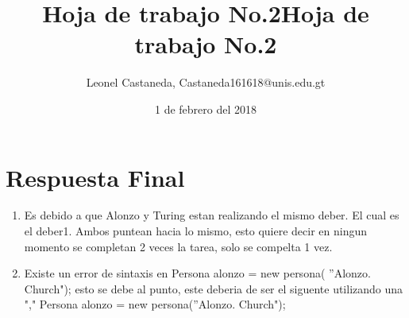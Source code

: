 \documentclass[10pt,a4paper]{article}
\author{Leonel Castaneda, Castaneda161618@unis.edu.gt}
\title{Hoja de trabajo No.2}
\date{1 de febrero del 2018}
\begin{document}
\title{Hoja de trabajo No.2}
\maketitle{}


\section{Respuesta Final}
\begin{enumerate}
\item Es debido a que Alonzo y Turing estan realizando el mismo deber. El cual es el deber1. Ambos puntean hacia lo mismo, esto quiere decir en ningun momento se completan 2 veces la tarea, solo se compelta 1 vez.
\item Existe un error de sintaxis en Persona alonzo = new persona(
''Alonzo. Church"); esto se debe al punto, este deberia de ser el siguente utilizando una "," Persona alonzo = new persona(''Alonzo. Church"); 
\end{enumerate}
\end{document}
